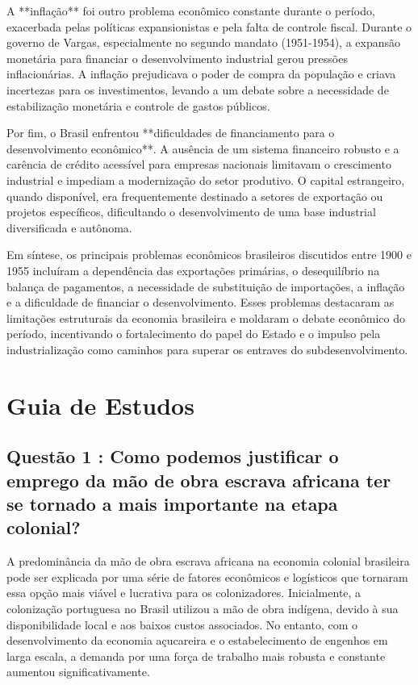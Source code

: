 \documentclass[a4paper,12pt]{article}[abntex2]
\begin{document}
A **inflação** foi outro problema econômico constante durante o período, exacerbada pelas políticas expansionistas e pela falta de controle fiscal. Durante o governo de Vargas, especialmente no segundo mandato (1951-1954), a expansão monetária para financiar o desenvolvimento industrial gerou pressões inflacionárias. A inflação prejudicava o poder de compra da população e criava incertezas para os investimentos, levando a um debate sobre a necessidade de estabilização monetária e controle de gastos públicos.

Por fim, o Brasil enfrentou **dificuldades de financiamento para o desenvolvimento econômico**. A ausência de um sistema financeiro robusto e a carência de crédito acessível para empresas nacionais limitavam o crescimento industrial e impediam a modernização do setor produtivo. O capital estrangeiro, quando disponível, era frequentemente destinado a setores de exportação ou projetos específicos, dificultando o desenvolvimento de uma base industrial diversificada e autônoma.

Em síntese, os principais problemas econômicos brasileiros discutidos entre 1900 e 1955 incluíram a dependência das exportações primárias, o desequilíbrio na balança de pagamentos, a necessidade de substituição de importações, a inflação e a dificuldade de financiar o desenvolvimento. Esses problemas destacaram as limitações estruturais da economia brasileira e moldaram o debate econômico do período, incentivando o fortalecimento do papel do Estado e o impulso pela industrialização como caminhos para superar os entraves do subdesenvolvimento.


\newpage
\section{\textbf{Guia de Estudos}}

\subsection{\textbf{Questão 1 : Como podemos justificar o emprego da mão de obra escrava africana ter se tornado a mais importante na etapa colonial?}}

A predominância da mão de obra escrava africana na economia colonial brasileira pode ser explicada por uma série de fatores econômicos e logísticos que tornaram essa opção mais viável e lucrativa para os colonizadores. Inicialmente, a colonização portuguesa no Brasil utilizou a mão de obra indígena, devido à sua disponibilidade local e aos baixos custos associados. No entanto, com o desenvolvimento da economia açucareira e o estabelecimento de engenhos em larga escala, a demanda por uma força de trabalho mais robusta e constante aumentou significativamente.
\end{document}

